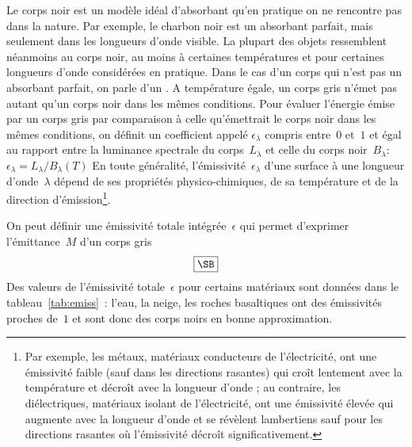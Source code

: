 \sk
Le corps noir est un modèle idéal d'absorbant qu'en pratique on ne rencontre pas dans la nature. Par exemple, le charbon noir est un absorbant parfait, mais seulement dans les longueurs d'onde visible. La plupart des objets ressemblent néanmoins au corps noir, au moins à certaines températures et pour certaines longueurs d'onde considérées en pratique. Dans le cas d'un corps qui n'est pas un absorbant parfait, on parle d'un . A température égale, un corps gris n'émet pas autant qu'un corps noir dans les mêmes conditions. Pour évaluer l'énergie émise par un corps gris par comparaison à celle qu'émettrait le corps noir dans les mêmes conditions, on définit un coefficient appelé  $\epsilon_\lambda$ compris entre~$0$ et~$1$ et égal au rapport entre la luminance spectrale du corps~$L_\lambda$ et celle du corps noir~$B_\lambda$: $ \epsilon_\lambda=L_\lambda / B_\lambda(T)$ En toute généralité, l'émissivité~$\epsilon_{\lambda}$ d'une surface à une longueur d'onde~$\lambda$ dépend de ses propriétés physico-chimiques, de sa température et de la direction d'émission\footnote{Par exemple, les métaux, matériaux conducteurs de l'électricité, ont une émissivité faible (sauf dans les directions rasantes) qui croît lentement avec la température et décroît avec la longueur d'onde ; au contraire, les diélectriques, matériaux isolant de l'électricité, ont une émissivité élevée qui augmente avec la longueur d'onde et se révèlent lambertiens sauf pour les directions rasantes où l'émissivité décroît significativement.}.

\sk
On peut définir une émissivité totale intégrée~$\epsilon$ qui permet d'exprimer l'émittance~$M$ d'un corps gris $$ \boxed{\SB} $$ Des valeurs de l'émissivité totale~$\epsilon$ pour certains matériaux sont données dans le tableau~\ref{tab:emiss}~: l'eau, la neige, les roches basaltiques ont des émissivités proches de~$1$ et sont donc des corps noirs en bonne approximation. 


